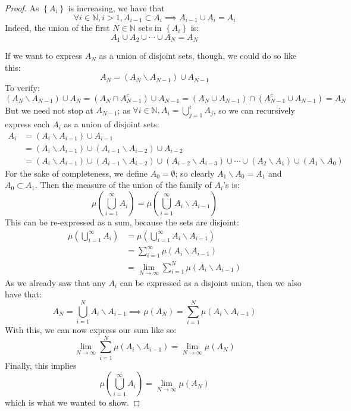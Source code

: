 \documentclass{article}
\newcommand{\parens}[1]{\left(#1\right)}
\newcommand{\bracks}[1]{\left\{#1\right\}}
\newcommand{\N}{\mathbb{N}}
\begin{document}
    \begin{proof}
    As $\bracks{A_i}$ is increasing, we have that 
    $$\forall i \in \N, i > 1, A_{i-1} \subset A_i \implies A_{i-1} 
    \cup A_{i} = A_i$$
    Indeed, the union of the first $N\in \N$ sets in $\bracks{A_i}$ 
    is:
    $$A_1 \cup A_2 \cup \cdots \cup A_N = A_N$$
    
    If we want to express $A_N$ as a union of disjoint sets, though, 
    we could do so like this:
    $$A_N = \parens{A_N\backslash A_{N-1}} \cup A_{N-1}$$
    To verify:
    $$\parens{A_N \backslash A_{N-1}} \cup A_{N}= \parens{A_N \cap 
    A_{N-1}^c} \cup A_{N-1} = \parens{A_N \cup A_{N-1}} 
    \cap \parens{A_{N-1}^c \cup A_{N-1}} = A_N$$
    But we need not stop at $A_{N-1}$; as $\forall i \in \N, 
    A_i = \bigcup_{j=1}^i A_j$, so we can recursively express each 
    $A_i$ as a union of disjoint sets:
    \begin{align*}
    A_i &= \parens{A_i\backslash A_{i-1}} \cup A_{i-1} \\
    &= \parens{A_i\backslash A_{i-1}} \cup \parens{A_{i-1}\backslash 
    A_{i-2}} \cup A_{i-2} \\
    &= \parens{A_i\backslash A_{i-1}} \cup \parens{A_{i-1}\backslash 
    A_{i-2}} \cup \parens{A_{i-2}\backslash A_{i-3}} \cup \cdots 
    \cup \parens{A_2\backslash A_1} \cup \parens{A_1\backslash A_0}
    \end{align*}
    For the sake of completeness, we define $A_0 = \emptyset$; so 
    clearly $A_1 \backslash A_0 = A_1$ and $A_0 \subset A_1$. 
    Then the measure of the union 
    of the family of $A_i$'s is:
    $$\mu\parens{\bigcup_{i=1}^\infty A_i} = 
    \mu\parens{\bigcup_{i=1}^\infty A_i\backslash A_{i-1}}$$
    This can be re-expressed as a sum, because the sets are disjoint:
    \begin{align*}
    \mu\parens{\bigcup_{i=1}^\infty A_i} &= \mu\parens{\bigcup_{i=1}^
    \infty A_i\backslash A_{i-1}} \\
    &= \sum_{i=1}^\infty \mu\parens{A_i\backslash A_{i-1}} \\
    &= \lim_{N\to\infty}\sum_{i=1}^N \mu\parens{A_i\backslash
     A_{i-1}}
    \end{align*}
    As we already saw that any $A_i$ can be expressed as a disjoint
    union, then we also have that:
    $$A_N = \bigcup_{i=1}^N A_i\backslash A_{i-1} \implies 
    \mu\parens{A_N} = \sum_{i=1}^N 
    \mu\parens{A_i \backslash A_{i-1}}$$
    With this, we can now express our sum like so:
    $$\lim_{N\to\infty}\sum_{i=1}^N 
    \mu\parens{A_i \backslash A_{i-1}} = 
    \lim_{N\to\infty}\mu\parens{A_N}$$
    Finally, this implies
    $$\mu\parens{\bigcup_{i=1}^\infty A_i} = \lim_{N\to\infty}
    \mu\parens{A_N}$$
    which is what we wanted to show.
    \end{proof}
    
\end{document}
